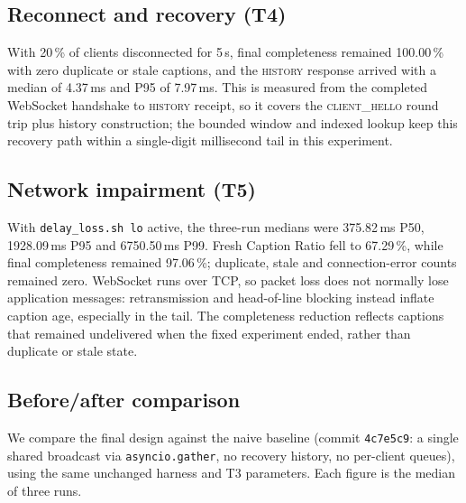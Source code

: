 \documentclass[11pt,a4paper]{article}
\begin{document}
\subsection{Reconnect and recovery (T4)}

With 20\,\% of clients disconnected for 5\,s, final completeness
remained 100.00\,\% with zero duplicate or stale captions, and the
\textsc{history} response arrived with a median of 4.37\,ms and P95 of
7.97\,ms. This is measured
from the completed WebSocket handshake to \textsc{history} receipt, so it
covers the \textsc{client\_hello} round trip plus history construction;
the bounded window and indexed lookup keep this recovery path within a
single-digit millisecond tail in this experiment.

\subsection{Network impairment (T5)}

With \texttt{delay\_loss.sh lo} active, the three-run medians were
375.82\,ms P50, 1928.09\,ms P95 and 6750.50\,ms P99. Fresh Caption Ratio
fell to 67.29\,\%, while final completeness remained 97.06\,\%; duplicate,
stale and connection-error counts remained zero. WebSocket runs over TCP,
so packet loss does not normally lose application messages: retransmission
and head-of-line blocking instead inflate caption age, especially in the
tail. The completeness reduction reflects captions that remained
undelivered when the fixed experiment ended, rather than duplicate or
stale state.

\subsection{Before/after comparison}
\label{sec:beforeafter}

We compare the final design against the naive baseline (commit
\texttt{4c7e5c9}: a single shared broadcast via \texttt{asyncio.gather},
no recovery history, no per-client queues), using the same unchanged
harness and T3 parameters. Each figure is the median of three runs.
\end{document}
